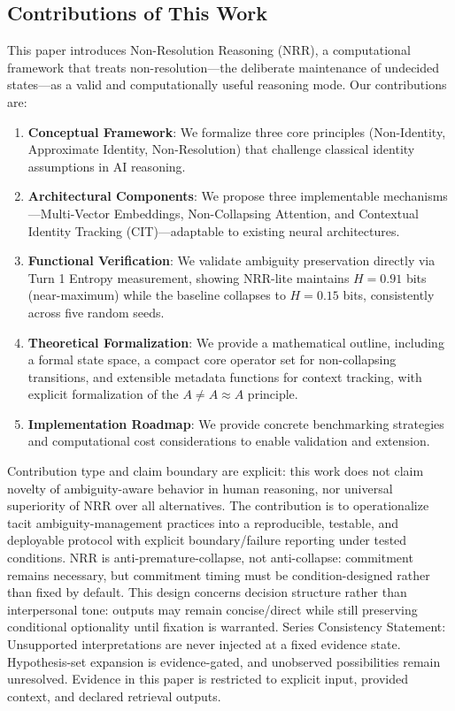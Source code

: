 \documentclass[11pt,a4paper]{article}
\newcommand{\AneqAapproxA}{A \neq A \approx A}
\begin{document}
\subsection{Contributions of This Work}

This paper introduces Non-Resolution Reasoning (NRR), a computational framework that treats non-resolution---the deliberate maintenance of undecided states---as a valid and computationally useful reasoning mode.
Our contributions are:

\begin{enumerate}
\item \textbf{Conceptual Framework}: We formalize three core principles (Non-Identity, Approximate Identity, Non-Resolution) that challenge classical identity assumptions in AI reasoning.
\item \textbf{Architectural Components}: We propose three implementable mechanisms---Multi-Vector Embeddings, Non-Collapsing Attention, and Contextual Identity Tracking (CIT)---adaptable to existing neural architectures.
\item \textbf{Functional Verification}: We validate ambiguity preservation directly via Turn 1 Entropy measurement, showing NRR-lite maintains $H = 0.91$ bits (near-maximum) while the baseline collapses to $H = 0.15$ bits, consistently across five random seeds.
\item \textbf{Theoretical Formalization}: We provide a mathematical outline, including a formal state space, a compact core operator set for non-collapsing transitions, and extensible metadata functions for context tracking, with explicit formalization of the $\AneqAapproxA$ principle.
\item \textbf{Implementation Roadmap}: We provide concrete benchmarking strategies and computational cost considerations to enable validation and extension.
\end{enumerate}

Contribution type and claim boundary are explicit: this work does not claim novelty of ambiguity-aware behavior in human reasoning, nor universal superiority of NRR over all alternatives. The contribution is to operationalize tacit ambiguity-management practices into a reproducible, testable, and deployable protocol with explicit boundary/failure reporting under tested conditions.
NRR is anti-premature-collapse, not anti-collapse: commitment remains necessary, but commitment timing must be condition-designed rather than fixed by default.
This design concerns decision structure rather than interpersonal tone: outputs may remain concise/direct while still preserving conditional optionality until fixation is warranted.
Series Consistency Statement: Unsupported interpretations are never injected at a fixed evidence state. Hypothesis-set expansion is evidence-gated, and unobserved possibilities remain unresolved. Evidence in this paper is restricted to explicit input, provided context, and declared retrieval outputs.
\end{document}
